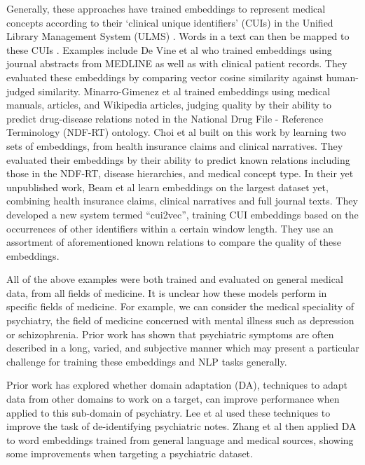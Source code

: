 \documentclass[10pt]{article}
\begin{document}
Generally, these approaches have trained embeddings to represent medical concepts according to their `clinical unique identifiers' (CUIs) in the Unified Library Management System (ULMS) \cite{bodenreiderUnifiedMedicalLanguage2004}. Words in a text can then be mapped to these CUIs \cite{yuShortIntroductionNILE2013}. Examples include De Vine et al  who trained embeddings using journal abstracts from MEDLINE as well as with clinical patient records. They evaluated these embeddings by comparing vector cosine similarity against human-judged similarity. Minarro-Gimenez et al  trained embeddings using medical manuals, articles, and Wikipedia articles, judging quality by their ability to predict drug-disease relations noted in the National Drug File - Reference Terminology (NDF-RT) ontology. Choi et al \cite{choiLearningLowDimensionalRepresentations2016} built on this work by learning two sets of embeddings, from health insurance claims and clinical narratives. They evaluated their embeddings by their ability to predict known relations including those in the NDF-RT, disease hierarchies, and medical concept type. In their yet unpublished work, Beam et al \cite{beamClinicalConceptEmbeddings2018} learn embeddings on the largest dataset yet, combining health insurance claims, clinical narratives and full journal texts. They developed a new system termed ``cui2vec'', training CUI embeddings based on the occurrences of other identifiers within a certain window length. They use an assortment of aforementioned known relations to compare the quality of these embeddings. 

All of the above examples were both trained and evaluated on general medical data, from all fields of medicine. It is unclear how these models perform in specific fields of medicine. For example, we can consider the medical speciality of psychiatry, the field of medicine concerned with mental illness such as depression or schizophrenia. Prior work has shown that psychiatric symptoms are often described in a long, varied, and subjective manner \cite{forbushSittingPinsNeedles2013} which may present a particular challenge for training these embeddings and NLP tasks generally.

Prior work has explored whether domain adaptation (DA), techniques to adapt data from other domains to work on a target, can improve performance when applied to this sub-domain of psychiatry. Lee et al \cite{leeLeveragingExistingCorpora2018} used these techniques to improve the task of de-identifying psychiatric notes. Zhang et al \cite{zhangAdaptingWordEmbeddings2018} then applied DA to word embeddings trained from general language and medical sources, showing some improvements when targeting a psychiatric dataset. 
\end{document}
